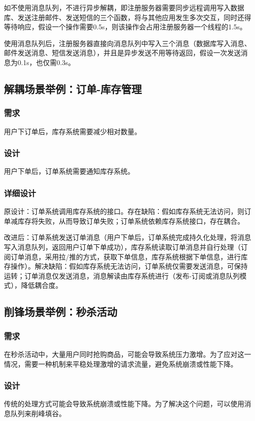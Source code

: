 \documentclass[11pt, a4paper, oneside, fontset=none]{ctexbook}
\begin{document}
如不使用消息队列，不进行异步解耦，即注册服务器需要同步远程调用写入数据库、发送注册邮件、发送短信的三个函数，将与其他应用发生多次交互，同时还得等待响应，假设一个操作需要0.5s，则该操作会占用注册服务器一个线程的1.5s。

使用消息队列后，注册服务器直接向消息队列中写入三个消息（数据库写入消息、邮件发送消息、短信发送消息），并且是异步发送不用等待返回，假设一次发送消息为0.1s，也仅需0.3s。

\subsection{解耦场景举例：订单-库存管理}
\subsubsection{需求}用户下订单后，库存系统需要减少相对数量。

\subsubsection{设计}
用户下单后，订单系统需要通知库存系统。

\subsubsection{详细设计}
原设计：订单系统调用库存系统的接口。存在缺陷：假如库存系统无法访问，则订单减库存将失败，从而导致订单失败；订单系统依赖库存系统接口，存在耦合。

改进后：订单系统发送订单消息（用户下单后，订单系统完成持久化处理，将消息写入消息队列，返回用户订单下单成功），库存系统读取订单消息并自行处理（订阅订单消息，采用拉/推的方式，获取下单信息，库存系统根据下单信息，进行库存操作）。解决缺陷：假如库存系统无法访问，订单系统仅需要发送消息，可保持运转；订单消息仅发送消息，消息解读由库存系统进行（发布-订阅或消息队列模式），降低耦合度。

\subsection{削锋场景举例：秒杀活动}
\subsubsection{需求}在秒杀活动中，大量用户同时抢购商品，可能会导致系统压力激增。为了应对这一情况，需要一种机制来平稳处理激增的请求流量，避免系统崩溃或性能下降。

\subsubsection{设计}
传统的处理方式可能会导致系统崩溃或性能下降。为了解决这个问题，可以使用消息队列来削峰填谷。
\end{document}
